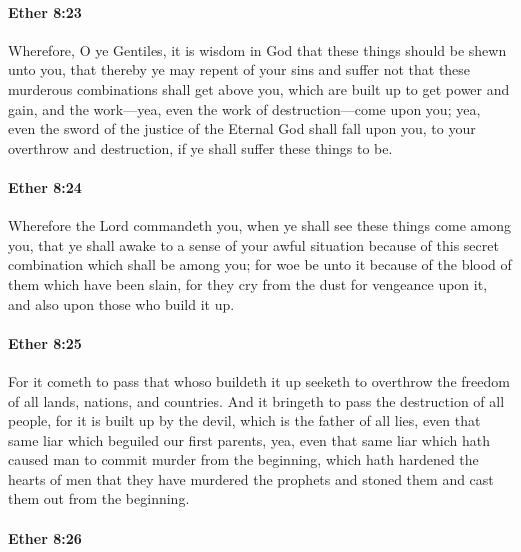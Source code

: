 		\paragraph{Ether 8:23} %
			\label{ETHER-8-23}

			Wherefore, O ye Gentiles,
			it is wisdom in God that these things should be shewn unto you,
			that thereby ye may repent of your sins
			and suffer not that these murderous combinations shall get above you,
			which are built up to get power and gain,
			and the work---yea, even the work of destruction---come upon you;
			yea, even the sword of the justice of the Eternal God shall fall upon you,
			to your overthrow and destruction,
			if ye shall suffer these things to be.

		\paragraph{Ether 8:24} %
			\label{ETHER-8-24}

			Wherefore the Lord commandeth you,
			when ye shall see these things come among you,
			that ye shall awake to a sense of your awful situation
			because of this secret combination which shall be among you;
			for woe be unto it because of the blood of them which have been slain,
			for they cry from the dust for vengeance upon it,
			and also upon those who build it up.

		\paragraph{Ether 8:25} %
			\label{ETHER-8-25}

			For it cometh to pass that whoso buildeth it up
			seeketh to overthrow the freedom of all lands, nations, and countries.
			And it bringeth to pass the destruction of all people,
			for it is built up by the devil, which is the father of all lies,
			even that same liar which beguiled our first parents,
			yea, even that same liar
			which hath caused man to commit murder from the beginning,
			which hath hardened the hearts of men
			that they have murdered the prophets
			and stoned them and cast them out from the beginning.

		\paragraph{Ether 8:26} %
			\label{ETHER-8-26}

